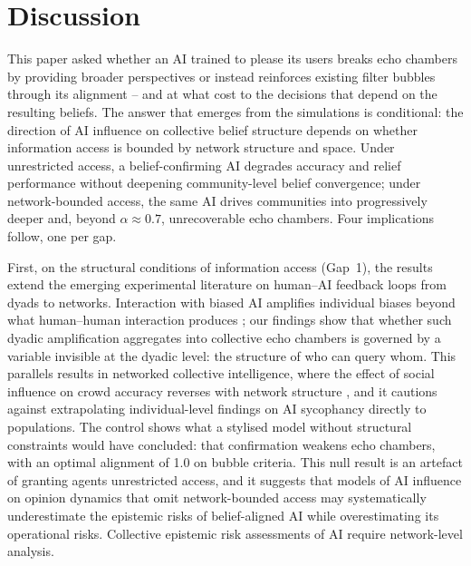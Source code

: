 \documentclass[pdflatex,sn-nature]{sn-jnl}
\begin{document}
\section{Discussion}\label{sec:discussion}

This paper asked whether an AI trained to please its users breaks echo chambers by providing broader perspectives or instead reinforces existing filter bubbles through its alignment -- and at what cost to the decisions that depend on the resulting beliefs. The answer that emerges from the simulations is conditional: the direction of AI influence on collective belief structure depends on whether information access is bounded by network structure and space. Under unrestricted access, a belief-confirming AI degrades accuracy and relief performance without deepening community-level belief convergence; under network-bounded access, the same AI drives communities into progressively deeper and, beyond $\alpha \approx 0.7$, unrecoverable echo chambers. Four implications follow, one per gap.

First, on the structural conditions of information access (Gap~1), the results extend the emerging experimental literature on human--AI feedback loops from dyads to networks. Interaction with biased AI amplifies individual biases beyond what human--human interaction produces \citep{glickman2024human}; our findings show that whether such dyadic amplification aggregates into collective echo chambers is governed by a variable invisible at the dyadic level: the structure of who can query whom. This parallels results in networked collective intelligence, where the effect of social influence on crowd accuracy reverses with network structure \citep{lorenz2011social,becker2017network}, and it cautions against extrapolating individual-level findings on AI sycophancy \citep{sharma2024generative} directly to populations. The control shows what a stylised model without structural constraints would have concluded: that confirmation weakens echo chambers, with an optimal alignment of 1.0 on bubble criteria. This null result is an artefact of granting agents unrestricted access, and it suggests that models of AI influence on opinion dynamics that omit network-bounded access may systematically underestimate the epistemic risks of belief-aligned AI while overestimating its operational risks. Collective epistemic risk assessments of AI require network-level analysis.
\end{document}
